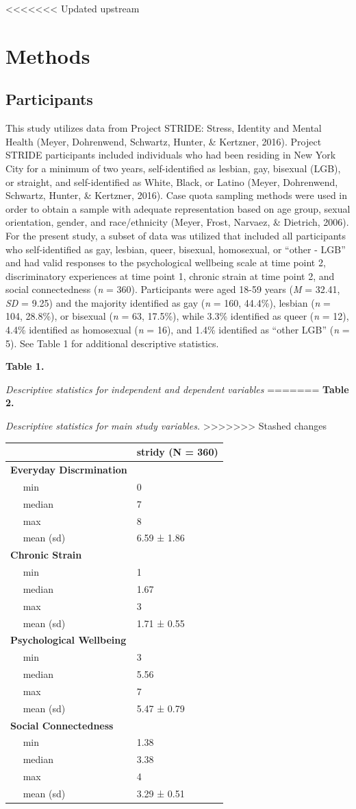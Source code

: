 \documentclass[
  english,
  man,floatsintext]{apa6}
\begin{document}
<<<<<<< Updated upstream
\hypertarget{methods-1}{%
\section{Methods}\label{methods-1}}

\hypertarget{participants-1}{%
\subsection{Participants}\label{participants-1}}

This study utilizes data from Project STRIDE: Stress, Identity and Mental Health (Meyer, Dohrenwend, Schwartz, Hunter, \& Kertzner, 2016). Project STRIDE participants included individuals who had been residing in New York City for a minimum of two years, self-identified as lesbian, gay, bisexual (LGB), or straight, and self-identified as White, Black, or Latino (Meyer, Dohrenwend, Schwartz, Hunter, \& Kertzner, 2016). Case quota sampling methods were used in order to obtain a sample with adequate representation based on age group, sexual orientation, gender, and race/ethnicity (Meyer, Frost, Narvaez, \& Dietrich, 2006). For the present study, a subset of data was utilized that included all participants who self-identified as gay, lesbian, queer, bisexual, homosexual, or ``other - LGB'' and had valid responses to the psychological wellbeing scale at time point 2, discriminatory experiences at time point 1, chronic strain at time point 2, and social connectedness (\emph{n} = 360). Participants were aged 18-59 years (\emph{M} = 32.41, \emph{SD} = 9.25) and the majority identified as gay (\emph{n} = 160, 44.4\%), lesbian (\emph{n} = 104, 28.8\%), or bisexual (\emph{n} = 63, 17.5\%), while 3.3\% identified as queer (\emph{n} = 12), 4.4\% identified as homosexual (\emph{n} = 16), and 1.4\% identified as ``other LGB'' (\emph{n} = 5). See Table 1 for additional descriptive statistics.

\textbf{Table 1.}

\emph{Descriptive statistics for independent and dependent variables}
=======
\textbf{Table 2.}

\emph{Descriptive statistics for main study variables.}
>>>>>>> Stashed changes

\begin{longtable}[]{@{}ll@{}}
\toprule
& stridy (N = 360)\tabularnewline
\midrule
\endhead
\textbf{Everyday Discrmination} & ~~\tabularnewline
~~ min & 0\tabularnewline
~~ median & 7\tabularnewline
~~ max & 8\tabularnewline
~~ mean (sd) & 6.59 ± 1.86\tabularnewline
\textbf{Chronic Strain} & ~~\tabularnewline
~~ min & 1\tabularnewline
~~ median & 1.67\tabularnewline
~~ max & 3\tabularnewline
~~ mean (sd) & 1.71 ± 0.55\tabularnewline
\textbf{Psychological Wellbeing} & ~~\tabularnewline
~~ min & 3\tabularnewline
~~ median & 5.56\tabularnewline
~~ max & 7\tabularnewline
~~ mean (sd) & 5.47 ± 0.79\tabularnewline
\textbf{Social Connectedness} & ~~\tabularnewline
~~ min & 1.38\tabularnewline
~~ median & 3.38\tabularnewline
~~ max & 4\tabularnewline
~~ mean (sd) & 3.29 ± 0.51\tabularnewline
\bottomrule
\end{longtable}
\end{document}
